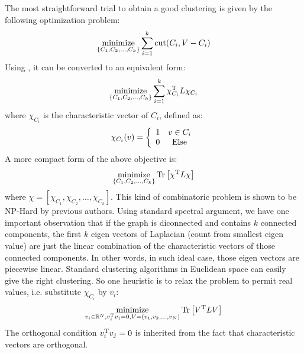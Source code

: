 The most straightforward trial to obtain a good clustering is 
given by the following optimization problem:
\begin{equation}
	\operatorname*{minimize}_{\{C_1, C_2, \ldots, C_k\}}{ \sum_{i=1}^{k}{\text{cut}(C_i, V-C_i)} }
	\label{eq:cut_def}
\end{equation}
Using \req{\ref{eq:lap_psd}}, it can be converted to an equivalent form:
\begin{equation}
	\operatorname*{minimize}_{\{C_1, C_2, \ldots, C_k\}}{ \sum_{i=1}^{k}
	{ \chi_{C_i}^\mathrm{T} L \chi_{C_i} } }
\end{equation}
where $ \chi_{C_i} $ is the characteristic vector of $ C_i $, defined as:
\begin{equation}
	\chi_{C_i}(v)= \left\lbrace
	\begin{array}{c c}
		1 &  v \in C_i \\
		0 &  \text{Else} 
	\end{array}\right.
\end{equation}
A more compact form of the above objective is:
\begin{equation}
	\operatorname*{minimize}_{\{C_1, C_2, \ldots, C_k\}}{ \mathrm{Tr}\left[ \chi^\mathrm{T} L \chi \right] }
\end{equation}
where $ \chi = [\chi_{C_1}, \chi_{C_2}, \ldots , \chi_{C_k}] $. 
This kind of combinatoric problem is shown to be NP-Hard by previous authors. 
Using standard spectral argument\cite{von2007tutorial}, 
we have one important observation that if the graph is diconnected 
and contains $ k $ connected components, the first $ k $ eigen vectors 
of Laplacian (count from smallest eigen value) are just the linear 
combination of the characteristic vectors of those connected components. 
In other words, in such ideal case, those eigen vectors are piecewise linear. 
Standard clustering algorithms in Euclidean space can easily 
give the right clustering. So one heuristic is to relax the problem 
to permit real values, i.e. substitute $ \chi_{C_i} $ by $ v_i $:
\begin{equation}
	\operatorname*{minimize}_{v_i \in \mathbb{R}^N, v_i^\mathrm{T}v_j = 0, V=(v_1,v_2, \ldots , v_N) }
	{ \mathrm{Tr}\left[ V^\mathrm{T} L V \right] }
	\label{eq:cut_relax}
\end{equation} 
The orthogonal condition $ v_i^\mathrm{T}v_j = 0 $ is inherited from 
the fact that characteristic vectors are orthogonal. 

